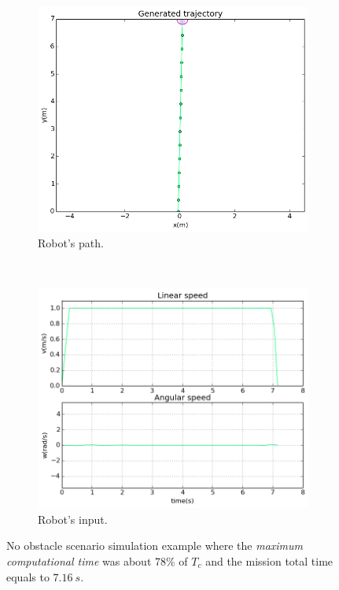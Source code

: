 \begin{figure}[!h]
        \centering
        ~ %
        \begin{subfigure}[b]{0.48\textwidth}
                \includegraphics[width=\textwidth]{./img/realtime/sim_results/p_0_0.4_2.0_9_5_0.001_15_40_20_5.0_0.1_3.0_0.5_1.0_10.0/multirobot-path.png}
                \caption{Robot's path.}\label{fig:sim0rpath}
        \end{subfigure}
        ~ %
        \begin{subfigure}[b]{0.48\textwidth}
		\includegraphics[width=\textwidth]{./img/realtime/sim_results/p_0_0.4_2.0_9_5_0.001_15_40_20_5.0_0.1_3.0_0.5_1.0_10.0/multirobot-vw.png}
                \caption{Robot's input.}\label{fig:sim0rinput}
        \end{subfigure}
        \caption{No obstacle scenario simulation example where the \textit{maximum computational time} was about 78\% of $T_c$ and the mission total time equals to $7.16\ s$.}\label{fig:sim0}
\end{figure}
\clearpage

